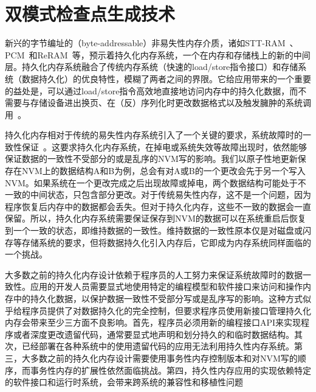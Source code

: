 \chapter{双模式检查点生成技术}
\label{chap:thynvm}

新兴的字节编址的（byte-addressable）非易失性内存介质，诸如STT-RAM~\cite{4443191,sttmram-ispass13}、PCM~\cite{Raoux:2008:PRA,lee-main-memory}和ReRAM~\cite{5607274}等，预示着持久化内存系统，一个在内存和存储栈上的新的中间层。持久化内存系统融合了传统内存系统（快速的load/store指令接口）和存储系统（数据持久化）的优良特性，模糊了两者之间的界限。它给应用带来的一个重要的益处是，可以通过load/store指令高效地直接地访问内存中的持久化数据，而不需要与存储设备进出换页、在（反）序列化时更改数据格式以及触发臃肿的系统调用~\cite{meza2013}。

持久化内存相对于传统的易失性内存系统引入了一个关键的要求，系统故障时的一致性保证~\cite{Lamb:1991:ODS,Copeland:1989:CSR,Shapiro:1999:EFC:319151.319163}。这要求持久化内存系统，在掉电或系统失效等故障出现时，依然能够保证数据的一致性不受部分的或是乱序的NVM写的影响。我们以原子性地更新保存在NVM上的数据结构A和B为例，总会有对A或B的一个更改会先于另一个写入NVM。如果系统在一个更改完成之后出现故障或掉电，两个数据结构可能处于不一致的中间状态，只包含部分更改。对于传统易失性内存，这不是一个问题，因为程序恢复后内存中的数据都会丢失。但对于持久化内存，这些不一致的数据会一直保留。所以，持久化内存系统需要保证保存到NVM的数据可以在系统重启后恢复到一个一致的状态，即维持数据的一致性。维持数据的一致性原本仅是对磁盘或闪存等存储系统的要求，但将数据持久化引入内存后，它即成为内存系统同样面临的一个挑战。

大多数之前的持久化内存设计依赖于程序员的人工努力来保证系统故障时的数据一致性\cite{
  Volos:2011:MLP:1950365.1950379, Coburn:2011:NMP:1950365.1950380,
  Venkataraman:2011:CDD:1960475.1960480, Intel:PMEM,
  Zhao:2013:KCP:2540708.2540744, Pelley:2014:MP}。应用的开发人员需要显式地使用特定的编程模型和软件接口来访问和操作内存中的持久化数据，以保护数据一致性不受部分写或是乱序写的影响。这种方式似乎给程序员提供了对数据持久化的完全控制，但要求程序员使用新接口管理持久化内存会带来至少三方面不良影响。首先，程序员必须用新的编程接口API来实现程序或者深度更改遗留代码，通常要显式地声明和划分持久的和临时数据结构。其次，已经部署在各种系统中的使用遗留代码的应用无法利用持久性内存系统。第三，大多数之前的持久化内存设计需要使用事务性内存控制版本和对NVM写的顺序，而事务性内存的扩展性依然面临挑战\cite{Cascaval:2008:STM:1454456.1454466, Pankratius:2011:STM:1989493.1989500, Dice:2009:EEC:1508244.1508263}。第四，持久性内存应用的实现依赖特定的软件接口和运行时系统\cite{Volos:2011:MLP:1950365.1950379, Coburn:2011:NMP:1950365.1950380, Venkataraman:2011:CDD:1960475.1960480, Intel:PMEM, SNIA:2013:NPM}，会带来跨系统的兼容性和移植性问题


